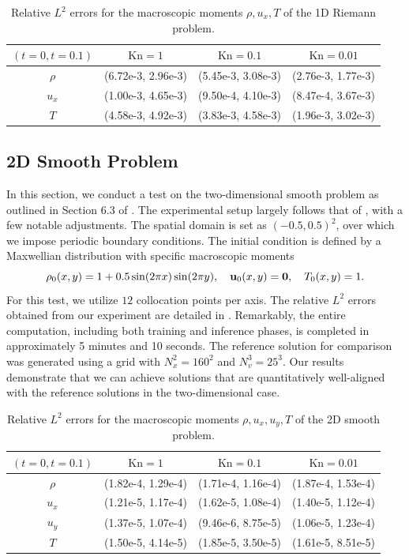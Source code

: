 \documentclass[preprint,12pt]{elsarticle}
\begin{document}
\begin{table}
\centering
\begin{tabular}{ |c|c|c|c| } 
 \hline
  $(t=0, t=0.1)$ & $\mathrm{Kn} = 1$ & $\mathrm{Kn} = 0.1$ & $\mathrm{Kn} = 0.01$ \\
  \hline
  $\rho$ & (6.72e-3, 2.96e-3) & (5.45e-3, 3.08e-3) & (2.76e-3, 1.77e-3) \\
  $u_x$ &(1.00e-3, 4.65e-3) & (9.50e-4, 4.10e-3) & (8.47e-4, 3.67e-3) \\
  $T$ & (4.58e-3, 4.92e-3) & (3.83e-3, 4.58e-3) & (1.96e-3, 3.02e-3) \\
 \hline
\end{tabular}
\caption{Relative $L^2$ errors for the macroscopic moments $\rho, u_x, T$ of the 1D Riemann problem.}
\label{tab:1d_riemann}
\end{table}


\subsection{2D Smooth Problem}\label{sec:2d_smooth}
In this section, we conduct a test on the two-dimensional smooth problem as outlined in Section 6.3 of \cite{li2023solving}.
The experimental setup largely follows that of , with a few notable adjustments.
The spatial domain is set as $(-0.5, 0.5)^2$, over which we impose periodic boundary conditions.
The initial condition is defined by a Maxwellian distribution with specific macroscopic moments 
\[
    \rho_0(x,y) = 1 + 0.5 \sin(2\pi x) \sin(2 \pi y), \quad
    {\bf u}_0(x,y) = {\bf 0}, \quad
    T_0(x,y) = 1.
\]
For this test, we utilize \(12\) collocation points per axis.
The relative $L^2$ errors obtained from our experiment are detailed in .
Remarkably, the entire computation, including both training and inference phases, is completed in approximately 5 minutes and 10 seconds.
The reference solution for comparison was generated using a grid with $N_x^2 = 160^2$ and $N_v^3 = 25^3$.
Our results demonstrate that we can achieve solutions that are quantitatively well-aligned with the reference solutions in the two-dimensional case.


\begin{table}
\centering
\begin{tabular}{ |c|c|c|c| } 
 \hline
  $(t=0, t=0.1)$ & $\mathrm{Kn} = 1$ & $\mathrm{Kn} = 0.1$ & $\mathrm{Kn} = 0.01$ \\
  \hline
  $\rho$ & (1.82e-4, 1.29e-4) & (1.71e-4, 1.16e-4) & (1.87e-4, 1.53e-4) \\
  $u_x$ & (1.21e-5, 1.17e-4) & (1.62e-5, 1.08e-4) & (1.40e-5, 1.12e-4) \\
  $u_y$ & (1.37e-5, 1.07e-4) & (9.46e-6, 8.75e-5) & (1.06e-5, 1.23e-4) \\
  $T$ & (1.50e-5, 4.14e-5) & (1.85e-5, 3.50e-5) & (1.61e-5, 8.51e-5) \\
 \hline
\end{tabular}
\caption{Relative $L^2$ errors for the macroscopic moments $\rho, u_x, u_y, T$ of the 2D smooth problem.}
\label{tab:2d_smooth}
\end{table}
\end{document}
